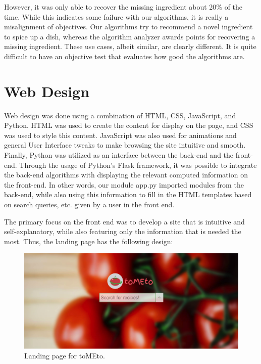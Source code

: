 \documentclass{acm_proc_article-sp}
\begin{document}
However, it was only able to recover the missing ingredient about 20\% of the time. While this indicates some failure with our algorithms, it is really a misalignment of objectives. Our algorithms try to recommend a novel ingredient to spice up a dish, whereas the algorithm analyzer awards points for recovering a missing ingredient. These use cases, albeit similar, are clearly different. It is quite difficult to have an objective test that evaluates how good the algorithms are.




\section{Web Design}

Web design was done using a combination of HTML, CSS, JavaScript, and Python. HTML was used to create the content for display on the page, and CSS was used to style this content. JavaScript was also used for animations and general User Interface tweaks to make browsing the site intuitive and smooth. Finally, Python was utilized as an interface between the back-end and the front-end. Through the usage of Python's Flask framework, it was possible to integrate the back-end algorithms with displaying the relevant computed information on the front-end. In other words, our module app.py imported modules from the back-end, while also using this information to fill in the HTML templates based on search queries, etc. given by a user in the front end. 

The primary focus on the front end was to develop a site that is intuitive and self-explanatory, while also featuring only the information that is needed the most. Thus, the landing page has the following design:

\begin{figure}[H]
\includegraphics[scale=0.5]{p1.png}
\caption{Landing page for toMEto.}
\end{figure}
\end{document}
